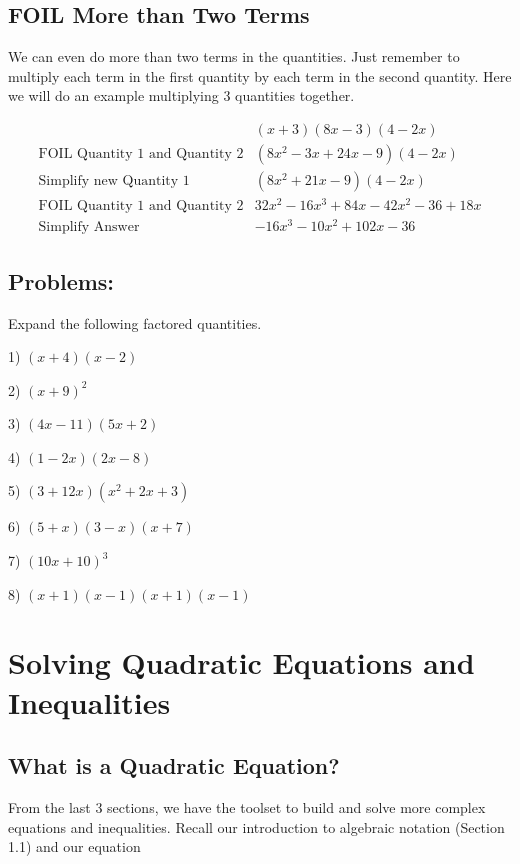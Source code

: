 \documentclass{book}
\theoremstyle{definition}
\begin{document}
\subsection{FOIL More than Two Terms}
We can even do more than two terms in the quantities. Just remember to multiply each term in the first quantity by each term in the second quantity. Here we will do an example multiplying 3 quantities together.

\begin{align*}\label{(5.2)}
&       &(x+3)(8x-3)(4-2x)& \\
&\text{FOIL Quantity 1 and Quantity 2}  &(8x^2-3x+24x-9)(4-2x) \\
&\text{Simplify new Quantity 1}  &(8x^2+21x-9)(4-2x) \\
&\text{FOIL Quantity 1 and Quantity 2}   &32x^2-16x^3+84x-42x^2-36+18x \\
&\text{Simplify Answer} &-16x^3-10x^2+102x-36&
\end{align*}

\subsection{Problems:}

Expand the following factored quantities.

\vspace{3mm}

1) $(x+4)(x-2)$

2) $(x+9)^2$

3) $(4x-11)(5x+2)$

4) $(1-2x)(2x-8)$

5) $(3+12x)(x^2+2x+3)$

6) $(5+x)(3-x)(x+7)$

7) $(10x+10)^3$

8) $(x+1)(x-1)(x+1)(x-1)$

\section{Solving Quadratic Equations and Inequalities}\label{Quadr}
\subsection{What is a Quadratic Equation?}
From the last 3 sections, we have the toolset to build and solve more complex equations and inequalities. Recall our introduction to algebraic notation (Section 1.1) and our equation
\end{document}
